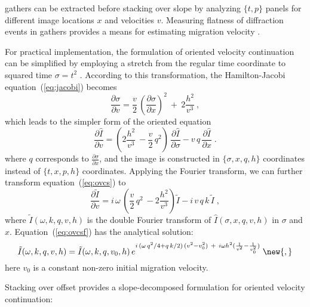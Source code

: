  gathers can be
extracted before stacking over slope by analyzing $\{t,p\}$ panels for different
image locations $x$ and velocities $v$. Measuring flatness of
diffraction events in  gathers provides a means for
estimating migration velocity \cite[]{landa08,reshef09}.

For practical implementation, the formulation of oriented velocity
continuation can be simplified by employing a stretch from the regular
time coordinate to squared time
$\sigma=t^2$ \cite[]{GEO68-05-16621672}. According to this
transformation, the Hamilton-Jacobi equation~(\ref{eq:jacobi}) becomes
\begin{equation}
\label{eq:jacobi2}      
\frac{\partial \sigma}{\partial v} = \frac{v}{2}\,\left(\frac{\partial \sigma}{\partial x}\right)^2\ +\ 2\frac{h^2}{v^3}\ ,
\end{equation}
which leads to the simpler form of the oriented equation
\begin{equation}
\label{eq:ovcs}
\frac{\partial \widehat{I}}{\partial v} = \left(2\frac{h^2}{v^3}\ - \frac{v}{2}\,q^2\right)\,\frac{\partial \widehat{I}}{\partial \sigma} - v\,q\,\frac{\partial \widehat{I}}{\partial x}\;. 
\end{equation} 
where $q$ corresponds to $\frac{\partial \sigma}{\partial x}$, and the image is
constructed in $\{\sigma,x,q,h\}$ coordinates instead of $\{t,x,p,h\}$
coordinates. Applying the Fourier transform, we
can further transform equation~(\ref{eq:ovcs}) to 
\begin{equation}
\label{eq:ovcsf}
\frac{\partial \tilde{I}}{\partial v} = i\,\omega\,\left(\frac{v}{2}\,q^2\ - 2 \frac{h^2}{v^3}\right)\tilde{I}- i
\,v\,q\,k\,\tilde{I}\;, 
\end{equation} 
where $\tilde{I}(\omega,k,q,v,h)$ is the double Fourier transform of
$\widehat{I}(\sigma,x,q,v,h)$ in $\sigma$ and $x$.
Equation~(\ref{eq:ovcsf}) has the analytical solution:
\begin{equation}
\label{eq:pshift}
\tilde{I}(\omega,k,q,v,h) = \tilde{I}(\omega,k,q,v_0,h)\,e^{i\,(\omega\,q^2/4+q\,k/2)\,(v^2-v_0^2)\ +\ i\omega h^2 (\frac{1}{v^2} - \frac{1}{v_0^2})}\;\new{,}
\end{equation} 
here $v_0$ is a constant non-zero initial migration velocity.

Stacking over offset provides a slope-decomposed formulation for oriented velocity continuation:


